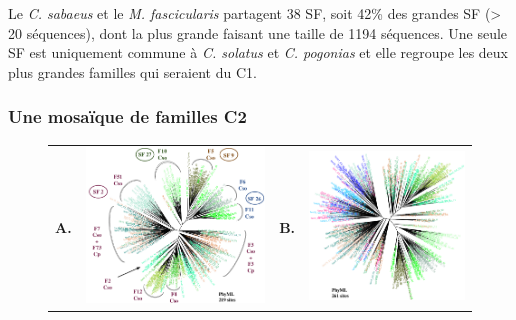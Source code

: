 \documentclass[12pt,a4paper]{article}
\begin{document}
	Le \textit{C. sabaeus} et le \textit{M. fascicularis} partagent 38 SF, soit 42\% des grandes SF (> 20 séquences), dont la plus grande faisant une taille de 1194 séquences. Une seule SF est uniquement commune à \textit{C. solatus} et \textit{C. pogonias} et elle regroupe les deux plus grandes familles qui seraient du C1.
	
	\subsubsection{Une mosaïque de familles C2}
			\begin{figure}
			\center	
			\begin{tabular}{cccc}
		\textbf{A.} & \includegraphics[scale=0.30]{img/tree_C2_pogonias_solatus.png} & \textbf{B.} & \includegraphics[scale=0.30]{img/tree_C2_all_species.png} \\

\end{tabular}
\end{figure}
\end{document}
